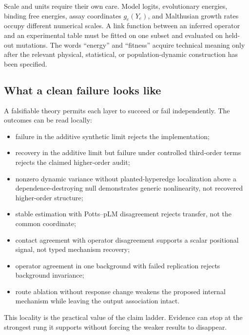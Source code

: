 Scale and units require their own care.  Model logits, evolutionary energies, binding free energies,
assay coordinates $g_e(Y_e)$, and Malthusian growth rates occupy different numerical scales.  A link
function between an inferred operator and an experimental table must be fitted on one subset and
evaluated on held-out mutations.  The words ``energy'' and ``fitness'' acquire technical meaning
only after the relevant physical, statistical, or population-dynamic construction has been
specified.

\subsection*{What a clean failure looks like}

A falsifiable theory permits each layer to succeed or fail independently.  The outcomes can be read
locally:
\begin{itemize}
\setlength{\itemsep}{2pt}
\item failure in the additive synthetic limit rejects the implementation;
\item recovery in the additive limit but failure under controlled third-order terms rejects the
claimed higher-order audit;
\item nonzero dynamic variance without planted-hyperedge localization above a dependence-destroying
null demonstrates generic nonlinearity, not recovered higher-order structure;
\item stable estimation with Potts--pLM disagreement rejects transfer, not the common coordinate;
\item contact agreement with operator disagreement supports a scalar positional signal, not typed
mechanism recovery;
\item operator agreement in one background with failed replication rejects background invariance;
\item route ablation without response change weakens the proposed internal mechanism while leaving
the output association intact.
\end{itemize}

This locality is the practical value of the claim ladder.  Evidence can stop at the strongest rung
it supports without forcing the weaker results to disappear.
